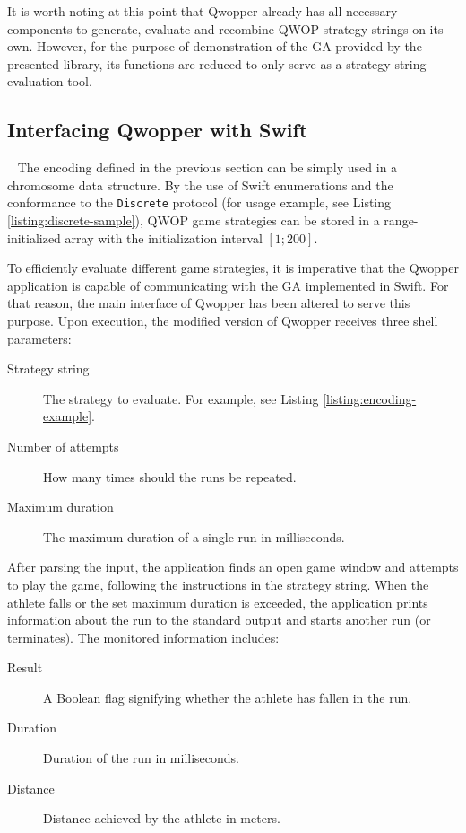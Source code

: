 It is worth noting at this point that Qwopper already has all necessary components to generate, evaluate and recombine QWOP strategy strings on its own. However, for the purpose of demonstration of the GA provided by the presented library, its functions are reduced to only serve as a strategy string evaluation tool.

\subsection{Interfacing Qwopper with Swift}~\label{section:qwop-interface}
The encoding defined in the previous section can be simply used in a chromosome data structure. By the use of Swift enumerations and the conformance to the \texttt{Discrete} protocol (for usage example, see Listing \ref{listing:discrete-sample}), QWOP game strategies can be stored in a range-initialized array with the initialization interval $[1;200]$.

To efficiently evaluate different game strategies, it is imperative that the Qwopper application is capable of communicating with the GA implemented in Swift. For that reason, the main interface of Qwopper has been altered to serve this purpose. Upon execution, the modified version of Qwopper receives three shell parameters:
~
\begin{description}
	\item[Strategy string]
	The strategy to evaluate. For example, see Listing \ref{listing:encoding-example}.

	\item[Number of attempts]
	How many times should the runs be repeated.

	\item[Maximum duration]
	The maximum duration of a single run in milliseconds.
\end{description}

After parsing the input, the application finds an open game window and attempts to play the game, following the instructions in the strategy string. When the athlete falls or the set maximum duration is exceeded, the application prints information about the run to the standard output and starts another run (or terminates). The monitored information includes:
~
\begin{description}
	\item[Result]
	A Boolean flag signifying whether the athlete has fallen in the run.

	\item[Duration]
	Duration of the run in milliseconds.

	\item[Distance]
	Distance achieved by the athlete in meters.
\end{description}

